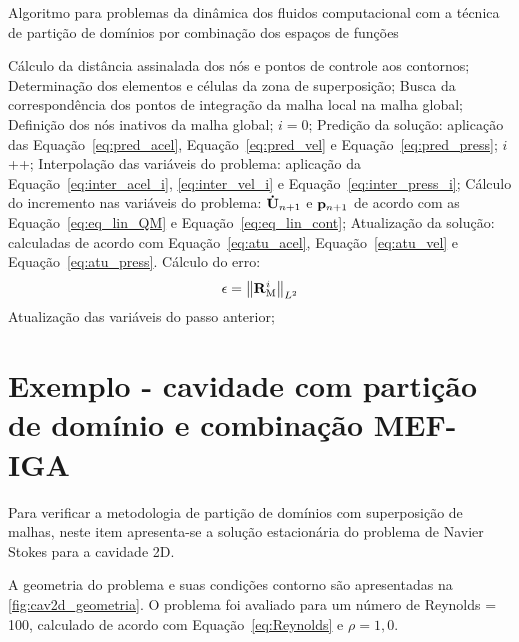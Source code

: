 \begin{algorithm}
	\caption{Algoritmo para problemas da dinâmica dos fluidos computacional com a técnica de partição de domínios por combinação dos espaços de funções}
	\label{alg:overlap}
	\begin{algorithmic}[1]
		\State Cálculo da distância assinalada dos nós e pontos de controle aos contornos;
		\State Determinação dos elementos e células da zona de superposição;
		\State Busca da correspondência dos pontos de integração da malha local na malha global;
		\State Definição dos nós inativos da malha global;
		\State $i=0$;
		\State Predição da solução: aplicação das Equação~\eqref{eq:pred_acel}, Equação~\eqref{eq:pred_vel} e Equação~\eqref{eq:pred_press};
		\State $i$++;
		\State Interpolação das variáveis do problema: aplicação da Equação~\eqref{eq:inter_acel_i}, \autoref {eq:inter_vel_i} e Equação~\eqref{eq:inter_press_i};
		\State Cálculo do incremento nas variáveis do problema: $\mathbf{\dot{U}}_{n+1}$ e $\mathbf{p}_{n+1}$ de acordo com as Equação~\eqref{eq:eq_lin_QM} e Equação~\eqref{eq:eq_lin_cont};
		\State Atualização da solução: calculadas de acordo com Equação~\eqref{eq:atu_acel}, Equação~\eqref{eq:atu_vel} e Equação~\eqref{eq:atu_press}.
		\State Cálculo do erro:
		\begin{align}
			\epsilon =\left\| \mathbf{R}_\mathrm{M}^i \right\|_{L^2}
		\end{align}
		\EndWhile
		\State Atualização das variáveis do passo anterior;
		\EndFor
	\end{algorithmic}
\end{algorithm}

\section{Exemplo - cavidade com partição de domínio e combinação MEF-IGA} \label{capitulo:cap5:Exemplo}

Para verificar a metodologia de partição de domínios com superposição de malhas, neste item apresenta-se a solução estacionária do problema de Navier Stokes para a cavidade 2D.

A geometria do problema e suas condições contorno são apresentadas na \autoref{fig:cav2d_geometria}. O problema foi avaliado para um número de Reynolds = 100, calculado de acordo com Equação~\eqref{eq:Reynolds} e $\rho = 1,0$.

